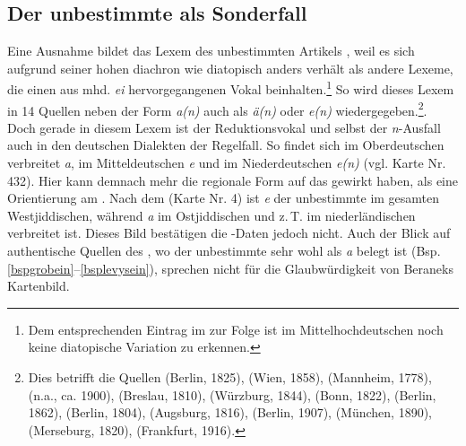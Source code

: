  \subsection{Der unbestimmte  als Sonderfall}\label{artikelkapitel}
 Eine Ausnahme bildet das Lexem des unbestimmten Artikels , weil es sich aufgrund seiner hohen  diachron wie diatopisch anders verhält als andere Lexeme, die einen aus mhd. \textit{ei} hervorgegangenen Vokal beinhalten.\footnote{Dem entsprechenden Eintrag im \textcite[Bd. 1, Sp. 520]{Lexer1992} zur Folge ist im Mittelhochdeutschen noch keine diatopische Variation zu erkennen.}   So wird dieses Lexem in 14 Quellen neben der Form \textit{a(n)} auch als \textit{ä(n)} oder \textit{e(n)} wiedergegeben.\footnote{Dies betrifft die Quellen  (Berlin, 1825),  (Wien, 1858),  (Mannheim, 1778),  (n.a., ca. 1900),  (Breslau, 1810),  (Würzburg, 1844),  (Bonn, 1822),  (Berlin, 1862),  (Berlin, 1804),  (Augsburg, 1816),  (Berlin, 1907),  (München, 1890),  (Merseburg, 1820),  (Frankfurt, 1916).}. Doch gerade in diesem Lexem ist der Reduktionsvokal und selbst der \textit{n}-Ausfall auch in den deutschen Dialekten der Regelfall. So findet sich im Oberdeutschen verbreitet \textit{a}, im Mitteldeutschen \textit{e} und im Niederdeutschen \textit{e(n)} (vgl.  Karte Nr. 432). Hier kann demnach mehr die regionale Form auf das  gewirkt haben, als eine Orientierung am . Nach dem  (Karte Nr. 4) ist \textit{e} der unbestimmte  im gesamten Westjiddischen, während \textit{a} im Ostjiddischen und z.\,T. im niederländischen  verbreitet ist. Dieses Bild bestätigen die -Daten jedoch nicht. Auch der Blick auf authentische Quellen des , wo der unbestimmte  sehr wohl als \textit{a} belegt ist (Bsp. \ref{bspgrobein}–\ref{bsplevysein}), sprechen nicht für die Glaubwürdigkeit von Beraneks Kartenbild. \\

 
